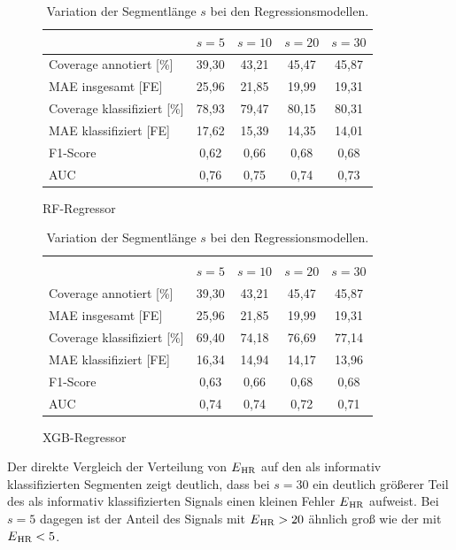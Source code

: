 \begin{table}[H]
	\begin{subfigure}{\textwidth}
	\centering
	\begin{tabular}{l || c | c | c | c }
								& $s = 5$	& $s=10$		& $s=20$		& $s=30$	\\ \hline
	Coverage annotiert [\%]		& 39,30		& 43,21	 	& 45,47		& 45,87\\
	\ac{MAE} insgesamt [FE]		& 25,96		& 21,85		& 19,99		& 19,31\\\hline
 	Coverage klassifiziert [\%]	& 78,93		& 79,47 		& 80,15		& 80,31\\
 	\ac{MAE} klassifiziert [FE]	& 17,62		& 15,39		& 14,35		& 14,01\\
 	F1-Score 					& 0,62		& 0,66		& 0,68		& 0,68\\
 	AUC 						& 0,76		& 0,75		& 0,74		& 0,73\\
 	\end{tabular}		
	\caption{\ac{RF}-Regressor}
	\end{subfigure}
	\begin{subfigure}{\textwidth}
	\centering
	\begin{tabular}{l || c | c | c | c }
	\multicolumn{5}{l}{	}	\\
								& $s = 5$	& $s=10$		& $s=20$		& $s=30$	\\ \hline
	Coverage annotiert [\%]		& 39,30		& 43,21	 	& 45,47		& 45,87\\
	\ac{MAE} insgesamt [FE]		& 25,96		& 21,85		& 19,99		& 19,31\\\hline
 	Coverage klassifiziert [\%]	& 69,40		& 74,18 		& 76,69		& 77,14\\
 	\ac{MAE} klassifiziert [FE]	& 16,34		& 14,94		& 14,17		& 13,96\\
 	F1-Score 					& 0,63		& 0,66		& 0,68		& 0,68\\
 	AUC 						& 0,74		& 0,74		& 0,72		& 0,71\\
 	\end{tabular}
	\caption{\ac{XGB}-Regressor}
	\end{subfigure}
	\caption{Variation der Segmentlänge $s$ bei den Regressionsmodellen.}
	\label{fig:var-s-regr}
\end{table}

Der direkte Vergleich der Verteilung von $E\textsubscript{HR}$ auf den als informativ klassifizierten Segmenten zeigt deutlich, dass bei $s=30$ ein deutlich größerer Teil des als informativ klassifizierten Signals einen kleinen Fehler $E\textsubscript{HR}$ aufweist. Bei $s=5$ dagegen ist der Anteil des Signals mit $E\textsubscript{HR} > 20$ ähnlich groß wie der mit $E\textsubscript{HR} < 5$.

